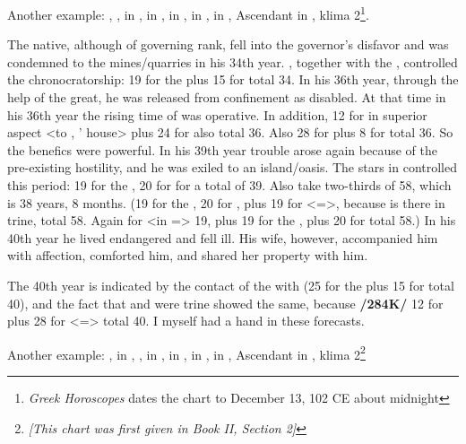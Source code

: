 Another example: \Sun, \Saturn, \Mercury\xspace in \Sagittarius, \Moon\xspace in \Cancer, \Jupiter\xspace in \Taurus, \Mars\xspace in \Leo, \Venus\xspace in \Capricorn, Ascendant in \Virgo, klima 2\footnote{\textit{Greek Horoscopes} dates the chart to December 13, 102 CE about midnight}.

The native, although of governing rank, fell into the governor’s disfavor and was condemned to the mines/quarries in his 34th year. \Mars, together with the \Sun, controlled the chronocratorship: 19 for the \Sun\xspace plus 15 for \Mars\xspace total 34. In his 36th year, through the help of the great, he was released from confinement as disabled. At that time in his 36th year the rising time of \Leo\xspace was operative. In addition, 12 for \Jupiter\xspace in superior aspect <to \Scorpio, \Mars’ house> plus 24 for \Taurus also total 36. Also 28 for \Capricorn\xspace plus 8 for \Venus\xspace total 36. So the benefics were powerful. In his 39th year trouble arose again because of the pre-existing hostility, and he was exiled to an island/oasis. The stars in \Sagittarius\xspace controlled this period: 19 for the \Sun, 20 for \Mercury\xspace for a total of 39. Also take two-thirds of 58, which is 38 years, 8 months. (19 for the \Sun, 20 for \Mercury, plus 19 for \Leo <=\Sun>, because \Mars\xspace is there in trine, total 58. Again for \Mars\xspace <in \Leo=\Sun> 19, plus 19 for the \Sun, plus 20 for \Mercury total 58.) In his 40th year he lived endangered and fell ill. His wife, however, accompanied him with affection, comforted him, and shared her property with him. 

The 40th year is indicated by the contact of the \Moon\xspace with \Mars\xspace (25 for the \Moon\xspace plus 15 for \Mars\xspace total 40), and the fact that \Jupiter\xspace and \Venus\xspace were trine showed the same, because \textbf{/284K/} 12 for \Jupiter\xspace plus 28 for \Venus\xspace <=\Capricorn> total 40. I myself had a hand in these forecasts.

Another example: \Sun, \Mercury\xspace in \Capricorn, \Moon, \Saturn\xspace in \Sagittarius, \Jupiter\xspace in \Cancer, \Mars\xspace in \Virgo, \Venus\xspace in \Aquarius, Ascendant in \Libra, klima 2\footnote{\textit{[This chart was first given in Book II, Section 2]}}


